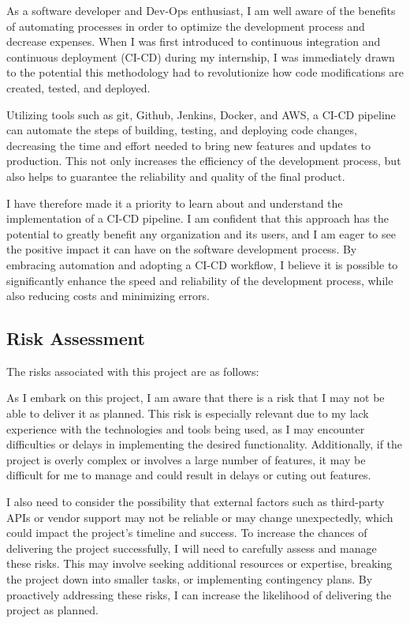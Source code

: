 \documentclass[
  10pt,
  paper=a4,
  ,captions=tableheading
]{scrartcl}
\begin{document}
As a software developer and Dev-Ops enthusiast, I am well aware of the
benefits of automating processes in order to optimize the development
process and decrease expenses. When I was first introduced to continuous
integration and continuous deployment (CI-CD) during my internship, I
was immediately drawn to the potential this methodology had to
revolutionize how code modifications are created, tested, and deployed.

Utilizing tools such as git, Github, Jenkins, Docker, and AWS, a CI-CD
pipeline can automate the steps of building, testing, and deploying code
changes, decreasing the time and effort needed to bring new features and
updates to production. This not only increases the efficiency of the
development process, but also helps to guarantee the reliability and
quality of the final product.

I have therefore made it a priority to learn about and understand the
implementation of a CI-CD pipeline. I am confident that this approach
has the potential to greatly benefit any organization and its users, and
I am eager to see the positive impact it can have on the software
development process. By embracing automation and adopting a CI-CD
workflow, I believe it is possible to significantly enhance the speed
and reliability of the development process, while also reducing costs
and minimizing errors.

\hypertarget{risk-assessment}{%
\subsection{Risk Assessment}\label{risk-assessment}}

The risks associated with this project are as follows:

As I embark on this project, I am aware that there is a risk that I may
not be able to deliver it as planned. This risk is especially relevant
due to my lack experience with the technologies and tools being used, as
I may encounter difficulties or delays in implementing the desired
functionality. Additionally, if the project is overly complex or
involves a large number of features, it may be difficult for me to
manage and could result in delays or cuting out features.

I also need to consider the possibility that external factors such as
third-party APIs or vendor support may not be reliable or may change
unexpectedly, which could impact the project's timeline and success. To
increase the chances of delivering the project successfully, I will need
to carefully assess and manage these risks. This may involve seeking
additional resources or expertise, breaking the project down into
smaller tasks, or implementing contingency plans. By proactively
addressing these risks, I can increase the likelihood of delivering the
project as planned.
\end{document}
